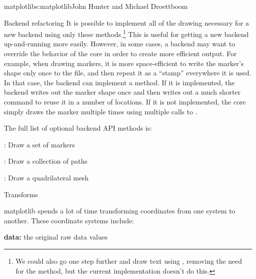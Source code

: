 \begin{aosachapter}{matplotlib}{s:matplotlib}{John Hunter and Michael Droettboom}
\begin{aosasect1}{Backend refactoring}
It is possible to implement all of the drawing necessary for a new
backend using only these methods.\footnote{We could also go one step
  further and draw text using , removing the need for
  the  method, but the current implementation doesn't
  do this.}  This is useful for getting a new backend up-and-running
more easily.  However, in some cases, a backend may want to override
the behavior of the core in order to create more efficient output.
For example, when drawing markers, it is more space-efficient to write
the marker's shape only once to the file, and then repeat it as a
``stamp'' everywhere it is used.  In that case, the backend can
implement a  method.  If it is implemented, the
backend writes out the marker shape once and then writes out a much
shorter command to reuse it in a number of locations.  If it is not
implemented, the core simply draws the marker multiple times using
multiple calls to .

The full list of optional backend API methods is:

\begin{aosaitemize}

  \item {}: Draw a set of markers

  \item {}: Draw a collection of paths

  \item {}: Draw a quadrilateral mesh

\end{aosaitemize}

\end{aosasect1}

\begin{aosasect1}{Transforms}


matplotlib spends a lot of time transforming coordinates from one
system to another.  These coordinate systems include:

\begin{aosaitemize}
\item \textbf{data:} the original raw data values


\end{aosaitemize}
\end{aosasect1}
\end{aosachapter}
